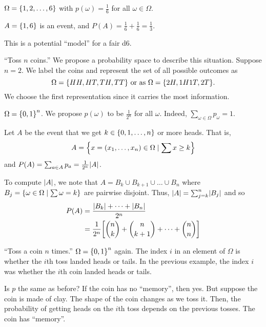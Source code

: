 \begin{examplelist}
    \item $\Omega = \set{1, 2, \dots, 6}$ with $p(\omega) = \frac{1}{6}$ for all
        $\omega \in \Omega$.

        $A = \set{1, 6}$ is an event, and
        $P(A) = \frac{1}{6} + \frac{1}{6} = \frac{1}{3}$.

        This is a potential ``model'' for a fair d6.
    \item ``Toss $n$ coins.''
        We propose a probability space to describe this situation.
        Suppose $n = 2$.
        We label the coins and represent the set of all possible outcomes as \[
            \Omega = \set{HH, HT, TH, TT} \text{ or as }
            \Omega = \set{2H, 1H1T, 2T}.
        \]
        We choose the first representation since it carries the most
        information.

        $\Omega = \set{0, 1}^{n}$.
        We propose $p(\omega)$ to be $\frac{1}{2^{n}}$ for all $\omega$.
        Indeed, $\sum_{\omega \in \Omega} p_{\omega} = 1$.

        Let $A$ be the event that we get $k \in \set{0, 1, \dots, n}$ or more
        heads.
        That is, \[
            A = \set{x = (x_{1}, \dots, x_{n}) \in \Omega \mid \sum x \geq k}
        \] and $P(A) = \sum_{a \in A} p_{a} = \frac{1}{2^{n}} \abs{A}$.
        
        To compute $\abs{A}$, we note that $A = B_{k} \cup B_{k+1} \cup \dots
        \cup B_{n}$ where $B_{j} =
        \set{\omega \in \Omega \mid \sum \omega = k}$ are pairwise disjoint.
        Thus, $\abs{A} = \sum_{j = k}^{n} \abs{B_{j}}$ and so
        \begin{align*}
            P(A) &= \frac{\abs{B_{k}} + \dots + \abs{B_{n}}}{2^{n}} \\
                &= \frac{1}{2^{n}} \brk{
                    \binom{n}{k} + \binom{n}{k+1} + \dots + \binom{n}{n}
                }
        \end{align*}
    \item ``Toss a coin $n$ times.''
        $\Omega = \set{0, 1}^{n}$ again.
        The index $i$ in an element of $\Omega$ is whether the $i$th toss landed
        heads or tails.
        In the previous example, the index $i$ was whether the $i$th coin
        landed heads or tails.

        Is $p$ the same as before?
        If the coin has no ``memory'', then yes.
        But suppose the coin is made of clay.
        The shape of the coin changes as we toss it.
        Then, the probability of getting heads on the $i$th toss depends on
        the previous tosses.
        The coin has ``memory''.
        

\end{examplelist}
